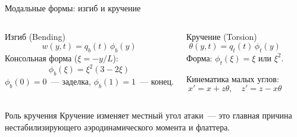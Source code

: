 \documentclass[9pt,aspectratio=169]{beamer}
\begin{document}
\begin{frame}{Модальные формы: изгиб и кручение}
  \begin{columns}[T]
      \begin{block}{Изгиб (Bending)}
        \[
          w(y,t) = q_b(t)\,\phi_b(y)
        \]
        Консольная форма ($\xi = -y/L$):
        \[
          \phi_b(\xi) = \xi^2(3 - 2\xi)
        \]
        $\phi_b(0)=0$~--- заделка, \; $\phi_b(1)=1$~--- конец.
      \end{block}

      \begin{block}{Кручение (Torsion)}
        \[
          \theta(y,t) = q_t(t)\,\phi_t(y)
        \]
        Форма: $\phi_t(\xi) = \xi$ или $\xi^2$.

        \medskip
        Кинематика малых углов:
        \[
          x' = x + z\theta, \quad z' = z - x\theta
        \]
      \end{block}
  \end{columns}

  \medskip

  \begin{alertblock}{Роль кручения}
    Кручение изменяет местный угол атаки~--- это \alert{главная причина}
    нестабилизирующего аэродинамического момента и флаттера.
  \end{alertblock}
\end{frame}
\end{document}
